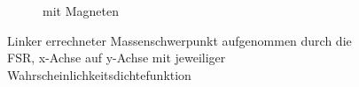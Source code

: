 \begin{landscape}
\begin{figure}[tb]
\begin{subfigure}[c]{.45\linewidth}
				\caption{mit Magneten}
			\end{subfigure}
		\caption{Linker errechneter Massenschwerpunkt aufgenommen durch die FSR, x-Achse auf y-Achse mit jeweiliger Wahrscheinlichkeitsdichtefunktion} \label{CoM_links}
	\end{figure}
\end{landscape}